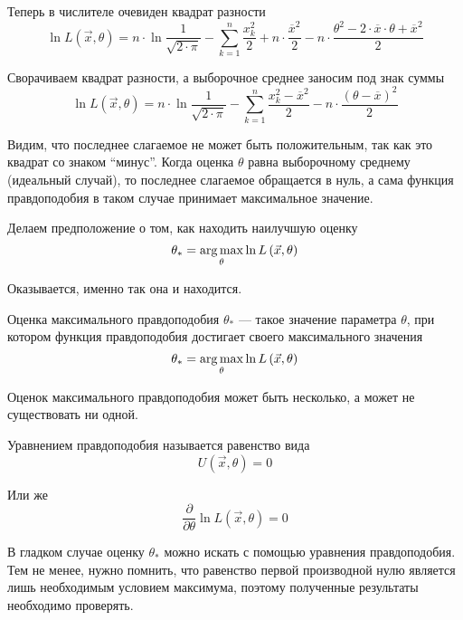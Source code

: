 \begin{example}
  Теперь в числителе очевиден квадрат разности
  $$\ln{L\left( \vec{x},\theta \right)}
    =n\cdot\ln{\frac{1}{\sqrt{2\cdot\pi}}}
      -\sum_{k=1}^n \frac{x_k^2}{2}
      +n\cdot\frac{\overline{x}^2}{2}
      -n\cdot\frac{\theta^2
        -2\cdot\overline{x}\cdot\theta
        +\overline{x}^2}{2}$$

  Сворачиваем квадрат разности,
  а выборочное среднее заносим под знак суммы
  $$\ln{L\left( \vec{x},\theta \right)}
    =n\cdot\ln{\frac{1}{\sqrt{2\cdot\pi}}}
      -\sum_{k=1}^n \frac{x_k^2-\overline{x}^2}{2}
      -n\cdot\frac{\left(\theta-\overline{x}\right)^2}{2}$$

  Видим, что последнее слагаемое не может быть положительным,
  так как это квадрат со знаком ``минус''.
  Когда оценка $\theta$ равна выборочному среднему (идеальный случай),
  то последнее слагаемое обращается в нуль, а сама функция правдоподобия
  в таком случае принимает максимальное значение.

  Делаем предположение о том, как находить наилучшую оценку
  $$\theta_*=\underset{\theta}{\operatorname{arg\,max}}\ln{L\left( \vec{x},\theta \right)}$$

  Оказывается, именно так она и находится.
\end{example}

\begin{definition}
  \label{def:maximumLikelihoodEstimation}
  Оценка максимального правдоподобия
  $\theta_*$ --- такое значение параметра $\theta$,
  при котором функция правдоподобия достигает своего максимального значения
  $$\theta_*=\underset{\theta}{\operatorname{arg\,max}}\ln{L\left( \vec{x},\theta \right)}$$
\end{definition}

\begin{remark}
  Оценок максимального правдоподобия может быть несколько,
  а может не существовать ни одной.
\end{remark}

\begin{definition}
  Уравнением правдоподобия называется равенство вида
  $$U\left( \vec{x},\theta \right)=0$$

  Или же
  $$\frac{\partial}{\partial\theta}\ln{L\left( \vec{x},\theta \right)}=0$$
\end{definition}

\begin{remark}
  В гладком случае оценку $\theta_*$ можно искать
  с помощью уравнения правдоподобия.
  Тем не менее, нужно помнить, что равенство первой производной нулю
  является лишь необходимым условием максимума,
  поэтому полученные результаты необходимо проверять.
\end{remark}

